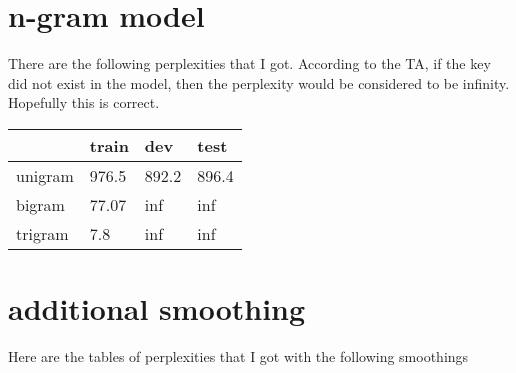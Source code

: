 \documentclass[12pt]{article}
\begin{document}
\section{n-gram model}
There are the following perplexities that I got. According to the TA, if the key did not exist in the model, then the perplexity would be considered to be infinity. Hopefully this is correct. 
\begin{table}[!h]
\centering
\begin{tabular}{|l|l|l|l|}
\hline
        & train & dev   & test  \\ \hline
unigram & 976.5 & 892.2 & 896.4 \\ \hline
bigram  & 77.07 & inf   & inf   \\ \hline
trigram & 7.8   & inf   & inf   \\ \hline
\end{tabular}
\end{table}

\section{additional smoothing}
Here are the tables of perplexities that I got with the following smoothings
\end{document}
